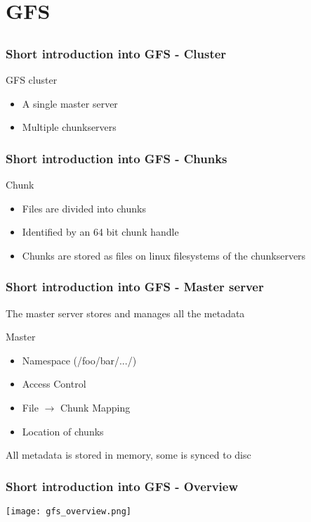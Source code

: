 \documentclass[notes=hide,yellow]{beamer}
\begin{document}
\section{GFS}
\subsection*{}
\begin{frame}
	\frametitle{Short introduction into GFS - Cluster}
	\begin{block}{GFS cluster}
		\begin{itemize}
			\item A single master server
			\item Multiple chunkservers
		\end{itemize}
	\end{block}
\end{frame}

\begin{frame}
	\frametitle{Short introduction into GFS - Chunks}
	\begin{block}{Chunk}
		\begin{itemize}
			
			\item Files are divided into chunks %
			\item Identified by an 64 bit chunk handle
			\item Chunks are stored as files on linux filesystems of the chunkservers
		\end{itemize}
	\end{block}
	
\end{frame}

\begin{frame}
	\frametitle{Short introduction into GFS - Master server}
	The master server stores and manages all the metadata
	\begin{block}{Master}
	\begin{itemize}
		\item Namespace (/foo/bar/.../)
		\item Access Control
		\item File $\rightarrow$ Chunk Mapping
		\item Location of chunks
	\end{itemize}
	\end{block}
	All metadata is stored in memory, some is synced to disc
\end{frame}

\begin{frame}
	\frametitle{Short introduction into GFS - Overview}
	\texttt{[image: gfs\_overview.png]}
\end{frame}
\end{document}
